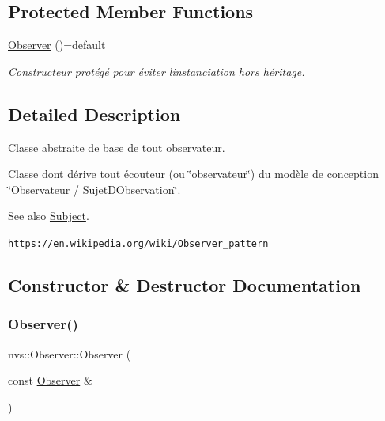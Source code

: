 \subsection*{Protected Member Functions}
\begin{DoxyCompactItemize}
\item 
\mbox{\hyperlink{classnvs_1_1_observer_a755ac6084a75b80cf8b7a7cf6fd4e8dd}{Observer}} ()=default
\begin{DoxyCompactList}\small\item\em Constructeur protégé pour éviter l\textquotesingle{}instanciation hors héritage. \end{DoxyCompactList}\end{DoxyCompactItemize}


\subsection{Detailed Description}
Classe abstraite de base de tout observateur. 

Classe dont dérive tout écouteur (ou \char`\"{}observateur\char`\"{}) du modèle de conception \char`\"{}\+Observateur / Sujet\+D\+Observation\char`\"{}.

\begin{DoxySeeAlso}{See also}
\mbox{\hyperlink{classnvs_1_1_subject}{Subject}}. 

\href{https://en.wikipedia.org/wiki/Observer_pattern}{\tt https\+://en.\+wikipedia.\+org/wiki/\+Observer\+\_\+pattern} 
\end{DoxySeeAlso}


\subsection{Constructor \& Destructor Documentation}
\mbox{\label{classnvs_1_1_observer_a4515f485c0ca822e088cffdfc30d3ed8}} 
\subsubsection{\texorpdfstring{Observer()}{Observer()}\hspace{0.1cm}{\footnotesize\ttfamily [1/3]}}
{\footnotesize\ttfamily nvs\+::\+Observer\+::\+Observer (\begin{DoxyParamCaption}\item[{const \mbox{\hyperlink{classnvs_1_1_observer}{Observer}} \&}]{ }\end{DoxyParamCaption})\hspace{0.3cm}{\ttfamily [default]}}



